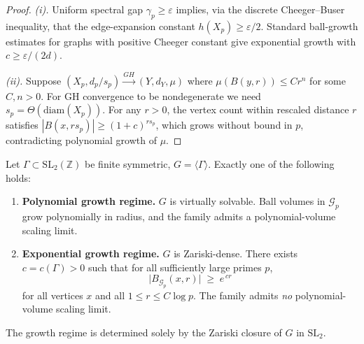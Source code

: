 \begin{proof}
  \emph{(i).}  Uniform spectral gap $\gamma_p \geq \varepsilon$ implies, via the
  discrete Cheeger--Buser inequality, that the edge-expansion constant
  $h(X_p) \geq \varepsilon/2$.  Standard ball-growth estimates for graphs with
  positive Cheeger constant give exponential growth with $c \geq \varepsilon/(2d)$.

  \emph{(ii).}  Suppose $(X_p, d_p/s_p) \xrightarrow{GH} (Y, d_Y, \mu)$ where
  $\mu(B(y, r)) \leq C r^n$ for some $C, n > 0$.  For GH convergence to be
  nondegenerate we need $s_p = \Theta(\mathrm{diam}(X_p))$.  For any $r > 0$,
  the vertex count within rescaled distance $r$ satisfies
  $|B(x, r s_p)| \geq (1+c)^{r s_p}$, which grows without bound in $p$,
  contradicting polynomial growth of $\mu$.
\end{proof}

\begin{theorem}
  \label{thm:growth_dichotomy}
  Let $\Gamma \subset \mathrm{SL}_2(\mathbb{Z})$ be finite symmetric,
  $G = \langle\Gamma\rangle$.  Exactly one of the following holds:
  \begin{enumerate}
    \item[\emph{(A)}] \textbf{Polynomial growth regime.}
      $G$ is virtually solvable.  Ball volumes in $\mathcal{G}_p$ grow polynomially
      in radius, and the family admits a polynomial-volume scaling limit.

    \item[\emph{(B)}] \textbf{Exponential growth regime.}
      $G$ is Zariski-dense.  There exists $c = c(\Gamma) > 0$ such that for all
      sufficiently large primes $p$,
      \[
        \bigl|B_{\mathcal{G}_p}(x, r)\bigr| \;\geq\; e^{\,cr}
      \]
      for all vertices $x$ and all $1 \leq r \leq C\log p$.
      The family admits \emph{no} polynomial-volume scaling limit.
  \end{enumerate}
  The growth regime is determined solely by the Zariski closure of
  $G$ in $\mathrm{SL}_2$.
\end{theorem}

